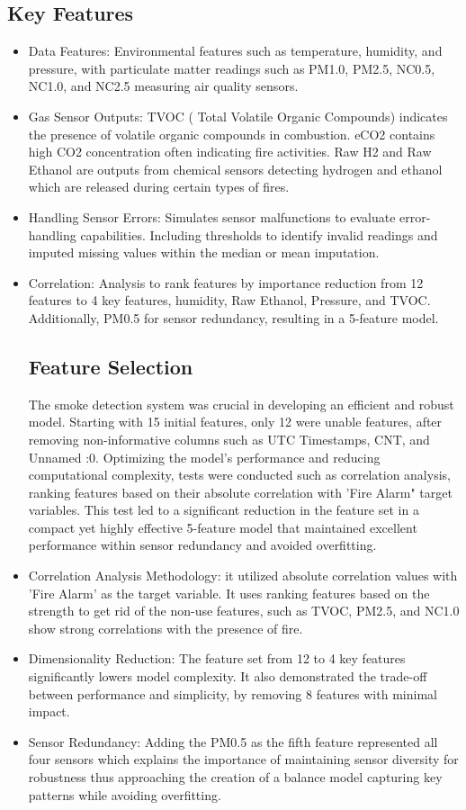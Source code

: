 \documentclass[conference]{IEEEtran}
\begin{document}
\subsection{Key Features}
\begin{itemize}
\item Data Features: Environmental features such as temperature, humidity, and pressure, with particulate matter readings such as PM1.0, PM2.5, NC0.5, NC1.0, and NC2.5 measuring air quality sensors. 
\item Gas Sensor Outputs: TVOC ( Total Volatile Organic Compounds)  indicates the presence of volatile organic compounds in combustion. eCO2 contains high CO2 concentration often indicating fire activities. Raw H2 and Raw Ethanol are outputs from chemical sensors detecting hydrogen and ethanol which are released during certain types of fires.  
\item Handling Sensor Errors: Simulates sensor malfunctions to evaluate error-handling capabilities. Including thresholds to identify invalid readings and imputed missing values within the median or mean imputation. 
\item Correlation: Analysis to rank features by importance reduction from 12 features to 4 key features, humidity, Raw Ethanol, Pressure, and TVOC. Additionally, PM0.5 for sensor redundancy, resulting in a 5-feature model.

\subsection{Feature Selection}
The smoke detection system was crucial in developing an efficient and robust model. Starting with 15 initial features, only 12 were unable features, after removing non-informative columns such as UTC Timestamps, CNT, and Unnamed :0. Optimizing the model's performance and reducing computational complexity, tests were conducted such as correlation analysis, ranking features based on their absolute correlation with 'Fire Alarm" target variables. This test led to a significant reduction in the feature set in a compact yet highly effective 5-feature model that maintained excellent performance within sensor redundancy and avoided overfitting. 
\item Correlation Analysis Methodology: it utilized absolute correlation values with 'Fire Alarm' as the target variable. It uses ranking features based on the strength to get rid of the non-use features, such as TVOC, PM2.5, and NC1.0 show strong correlations with the presence of fire. 
\item Dimensionality Reduction: The feature set from 12 to 4 key features significantly lowers model complexity. It also demonstrated the trade-off between performance and simplicity, by removing 8 features with minimal impact. 
\item Sensor Redundancy: Adding the PM0.5 as the fifth feature represented all four sensors which explains the importance of maintaining sensor diversity for robustness thus approaching the creation of a balance model capturing key patterns while avoiding overfitting. 
\end{itemize}
\end{document}
